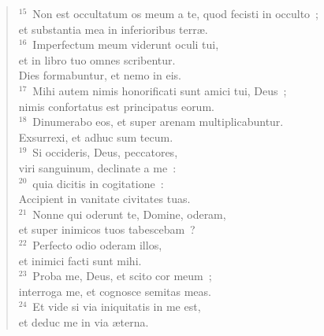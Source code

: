 \begin{flushleft}
\begin{verse}
${}^{15}$~Non est occultatum os meum a te, quod fecisti in occulto~;\\ et substantia mea in inferioribus terr\ae .\\
${}^{16}$~Imperfectum meum viderunt oculi tui,\\ et in libro tuo omnes scribentur.\\ Dies formabuntur, et nemo in eis.\\
${}^{17}$~Mihi autem nimis honorificati sunt amici tui, Deus~;\\ nimis confortatus est principatus eorum.\\
${}^{18}$~Dinumerabo eos, et super arenam multiplicabuntur.\\ Exsurrexi, et adhuc sum tecum.\\
${}^{19}$~Si occideris, Deus, peccatores,\\ viri sanguinum, declinate a me~:\\
${}^{20}$~quia dicitis in cogitatione~:\\ Accipient in vanitate civitates tuas.\\
${}^{21}$~Nonne qui oderunt te, Domine, oderam,\\ et super inimicos tuos tabescebam~?\\
${}^{22}$~Perfecto odio oderam illos,\\ et inimici facti sunt mihi.\\
${}^{23}$~Proba me, Deus, et scito cor meum~;\\ interroga me, et cognosce semitas meas.\\
${}^{24}$~Et vide si via iniquitatis in me est,\\ et deduc me in via \ae terna.\end{verse}\end{flushleft}


